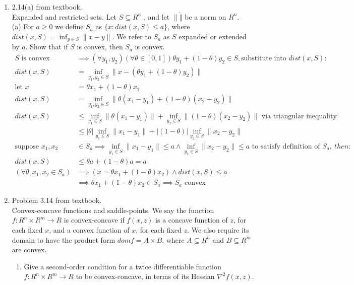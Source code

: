 \documentclass[12pt,letter]{article}
\newcommand{\norm}[1]{\|#1\|}
\begin{document}
\begin{enumerate}
\item 2.14(a) from textbook.\\
  Expanded and restricted sets. Let $S \subseteq R^n$ , and let $\norm{\dot}$ be a norm on $R^n$.\\
  (a) For $a \geq 0$ we define $S_a$ as $\{x : dist(x, S) \leq a\}$, where $dist(x, S) = \inf_{y\in S} \norm{x-y}$. We refer to $S_a$ as $S$ expanded or extended by $a$. Show that if $S$ is convex, then $S_a$ is convex.
  \begin{align*}
    S \text{ is convex} &\implies (\forall y_1, y_2) (\forall \theta \in [0,1]) \theta y_1 + (1-\theta) y_2 \in S, \text{substitute into }dist(x,S):\\
    dist(x,S) &= \inf_{y_1,y_2 \in S} \norm{x-(\theta y_1 + (1-\theta) y_2)}\\
    \text{let } x &= \theta x_1 + (1-\theta) x_2\\
    dist(x,S) &= \inf_{y_1,y_2 \in S} \norm{\theta(x_1-y_1) + (1-\theta)(x_2-y_2)}\\
    dist(x,S) &\leq \inf_{y_1\in S}\norm{\theta(x_1-y_1)} + \inf_{y_2 \in S}\norm{(1-\theta)(x_2-y_2)} \text{ via triangular inequality}\\
                        &\leq |\theta| \inf_{y_1\in S}\norm{x_1-y_1} + |(1-\theta)|\inf_{y_2 \in S}\norm{x_2-y_2}\\
    \text{suppose } x_1, x_2 & \in S_a \implies \inf_{y_1\in S}\norm{x_1-y_1} \leq a \wedge \inf_{y_2 \in S}\norm{x_2-y_2} \leq a \text{ to satisfy definition of }S_a,\ then:\\
    dist(x,S) &\leq \theta a + (1-\theta)a=a\\
    (\forall \theta, x_1, x_2 \in S_a) & \implies (x=\theta x_1 + (1-\theta) x_2) \wedge dist(x, S) \leq a \\ & \implies  \theta x_1 + (1-\theta) x_2 \in S_a \implies S_a \text{ convex}
  \end{align*}
  
  \pagebreak
  
\item Problem 3.14 from textbook.\\
  Convex-concave functions and saddle-points. We say the function $f: R^n \times R^m \to R$ is convex-concave if $f(x, z)$ is a concave function of $z$, for each fixed $x$, and a convex function of $x$, for each fixed $z$. We also require its domain to have the product form $dom f = A \times B$, where $A \subseteq R^n$ and $B \subseteq R^m$ are convex.\\
  \begin{enumerate}
  \item Give a second-order condition for a twice differentiable function $f : R^n \times R^m \to R$ to be convex-concave, in terms of its Hessian $\nabla^2 f(x, z)$.


\end{enumerate}
\end{enumerate}
\end{document}
